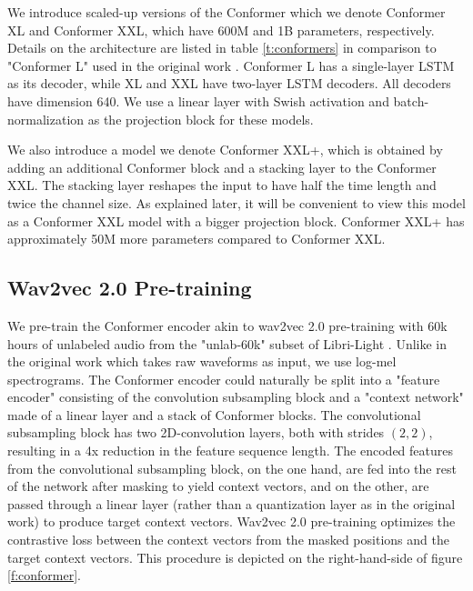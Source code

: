 \documentclass[dvipsnames]{article}
\begin{document}
We introduce scaled-up versions of the Conformer which we denote Conformer XL and Conformer XXL, which have 600M and 1B parameters, respectively. Details on the architecture are listed in table \ref{t:conformers} in comparison to "Conformer L" used in the original work \cite{conformer}. Conformer L has a single-layer LSTM as its decoder, while XL and XXL have two-layer LSTM decoders. All decoders have dimension 640. We use a linear layer with Swish activation \cite{ramachandran2017searching} and batch-normalization as the projection block for these models.

\begin{table}[h!]
  \caption{Parameters for Conformer models.}
  \vskip 0.1in
  \label{t:conformers}
  \centering
\end{table}

We also introduce a model we denote Conformer XXL+, which is obtained by adding an additional Conformer block and a stacking layer to the Conformer XXL. The stacking layer reshapes the input to have half the time length and twice the channel size. As explained later, it will be convenient to view this model as a Conformer XXL model with a bigger projection block. Conformer XXL+ has approximately 50M more parameters compared to Conformer XXL.

\subsection{Wav2vec 2.0 Pre-training}

We pre-train the Conformer encoder akin to wav2vec 2.0 pre-training \cite{wav2vec2} with 60k hours of unlabeled audio from the "unlab-60k" subset of Libri-Light \cite{librilight}. Unlike in the original work which takes raw waveforms as input, we use log-mel spectrograms. The Conformer encoder could naturally be split into a "feature encoder" consisting of the convolution subsampling block and a "context network" made of a linear layer and a stack of Conformer blocks. The convolutional subsampling block has two 2D-convolution layers, both with strides $(2,2)$, resulting in a 4x reduction in the feature sequence length. The encoded features from the convolutional subsampling block, on the one hand, are fed into the rest of the network after masking to yield context vectors, and on the other, are passed through a linear layer (rather than a quantization layer as in the original work) to produce target context vectors. Wav2vec 2.0 pre-training optimizes the contrastive loss between the context vectors from the masked positions and the target context vectors. This procedure is depicted on the right-hand-side of figure \ref{f:conformer}.
\end{document}
